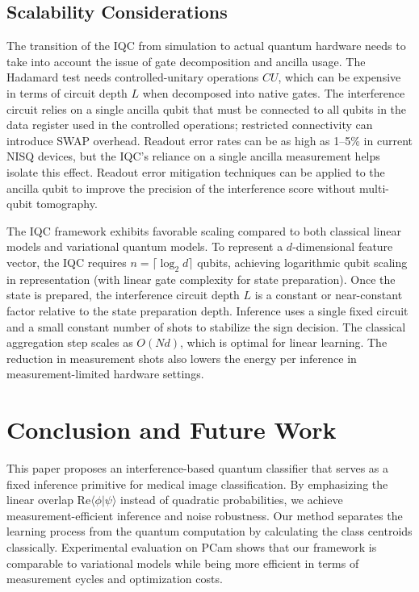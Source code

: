 \documentclass[conference]{IEEEtran}
\begin{document}
\subsection{Scalability Considerations}
The transition of the IQC from simulation to actual quantum hardware needs to take into account the issue of gate decomposition and ancilla usage. The Hadamard test needs controlled-unitary operations $CU$, which can be expensive in terms of circuit depth $L$ when decomposed into native gates. The interference circuit relies on a single ancilla qubit that must be connected to all qubits in the data register used in the controlled operations; restricted connectivity can introduce SWAP overhead. Readout error rates can be as high as 1--5\% in current NISQ devices, but the IQC's reliance on a single ancilla measurement helps isolate this effect. Readout error mitigation techniques can be applied to the ancilla qubit to improve the precision of the interference score without multi-qubit tomography.

The IQC framework exhibits favorable scaling compared to both classical linear models and variational quantum models. To represent a $d$-dimensional feature vector, the IQC requires $n = \lceil \log_2 d \rceil$ qubits, achieving logarithmic qubit scaling in representation (with linear gate complexity for state preparation). Once the state is prepared, the interference circuit depth $L$ is a constant or near-constant factor relative to the state preparation depth. Inference uses a single fixed circuit and a small constant number of shots to stabilize the sign decision. The classical aggregation step scales as $O(Nd)$, which is optimal for linear learning. The reduction in measurement shots also lowers the energy per inference in measurement-limited hardware settings.

\section{Conclusion and Future Work}
This paper proposes an interference-based quantum classifier that serves as a fixed inference primitive for medical image classification. By emphasizing the linear overlap $\mathrm{Re}\langle \phi | \psi \rangle$ instead of quadratic probabilities, we achieve measurement-efficient inference and noise robustness. Our method separates the learning process from the quantum computation by calculating the class centroids classically. Experimental evaluation on PCam shows that our framework is comparable to variational models while being more efficient in terms of measurement cycles and optimization costs.
\end{document}

